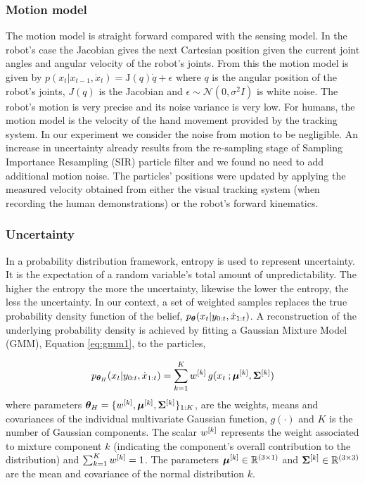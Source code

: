 \subsubsection{Motion model}

The motion model is straight forward compared with the sensing model. In the robot's case the Jacobian gives the next 
Cartesian position given the current joint angles and angular velocity of the robot's joints.
From this the motion model is given by $ p(x_{t}|x_{t-1},\dot{x}_{t}) = \mathrm{J}(q)\dot{q} + \epsilon$ where $q$ is 
the angular position of the robot's joints, $J(q)$ is the Jacobian and $\epsilon \sim \mathcal{N}(0,\sigma^{2}I)$ is white noise. 
The robot's motion is very precise and its noise variance is very low. For humans, the motion model is the velocity of the hand 
movement provided by the tracking system. In our experiment we consider the noise from motion to be negligible. An increase in 
uncertainty already results from the re-sampling stage of Sampling Importance Resampling (SIR) particle filter and we found 
no need to add additional motion noise.
The particles' positions were updated by applying the measured velocity obtained from either the visual tracking system 
(when recording the human demonstrations) or the robot's forward kinematics.

\subsubsection{Uncertainty}


In a probability distribution framework, entropy is used to represent uncertainty. It is the expectation of a 
random variable's total amount of unpredictability. The higher the entropy the more the uncertainty, likewise the 
lower the entropy, the less the uncertainty. In our context, a set of weighted samples replaces 
the true probability density function of the belief, $p_{\boldsymbol{\theta}}(x_t|y_{0:t},\dot{x}_{1:t})$. A reconstruction of 
the underlying probability density is achieved by fitting a Gaussian  Mixture Model (GMM), Equation \ref{eq:gmm1}, to the particles,

\begin{equation}\label{eq:gmm1}
  p_{\boldsymbol{\theta}_H}(x_t|y_{0:t},\dot{x}_{1:t}) = \sum\limits_{k=1}^{K} w^{[k]}\, g(x_t\: ;\boldsymbol{\mu}^{[k]},\boldsymbol{\Sigma}^{[k]} )
\end{equation}
where parameters $\boldsymbol{\theta}_H = \{w^{[k]},\boldsymbol{\mu}^{[k]},\boldsymbol{\Sigma}^{[k]}\}_{1:K}$, are the weights, means and covariances of the individual multivariate Gaussian function, $g(\cdot)$ and
$K$ is the number of Gaussian components. The scalar $w^{[k]}$ represents the weight associated to mixture component $k$ 
(indicating the component's overall contribution to the distribution) and $\sum_{k=1}^{K} w^{[k]} = 1$. The parameters $\boldsymbol{\mu}^{[k]} \in \mathbb{R}^{(3\times 1)}$ 
and $\boldsymbol{\Sigma}^{[k]} \in \mathbb{R}^{(3\times 3)}$ are the mean and covariance of the normal distribution $k$. 

